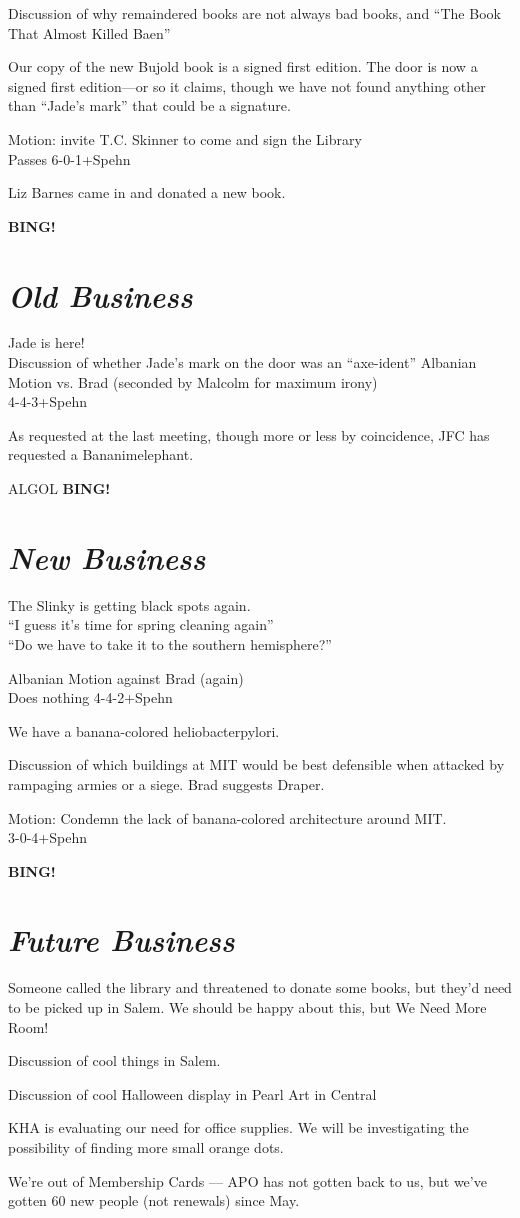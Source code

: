 \documentclass[10pt]{article}
\newcommand{\bing}{{\bf BING!} }
\newcommand{\goto}[1]{\bing \vskip 12pt \section*{{\em{#1}}}}
\begin{document}
Discussion of why remaindered books are not always bad books, and
``The Book That Almost Killed Baen''

Our copy of the new Bujold book is a signed first edition. The door is
now a signed first edition---or so it claims, though we have not found
anything other than ``Jade's mark'' that could be a signature.  

Motion: invite T.C. Skinner to come and sign the Library\\
Passes 6-0-1+Spehn

Liz Barnes came in and donated a new book.

\goto{Old Business}
Jade is here! \\
Discussion of whether Jade's mark on the door was an ``axe-ident''
Albanian Motion vs. Brad (seconded by Malcolm for maximum irony)\\
4-4-3+Spehn

As requested at the last meeting, though more or less by coincidence,
JFC has requested a Bananimelephant.

ALGOL
\goto{New Business}
The Slinky is getting black spots again.\\
``I guess it's time for spring cleaning again''\\
``Do we have to take it to the southern hemisphere?''

Albanian Motion against Brad (again)\\
Does nothing 4-4-2+Spehn

We have a banana-colored heliobacterpylori.

Discussion of which buildings at MIT would be best defensible when
attacked by rampaging armies or a siege.  Brad suggests Draper.

Motion: Condemn the lack of banana-colored architecture around MIT.\\
3-0-4+Spehn

\goto{Future Business}
Someone called the library and threatened to donate some books, but
they'd need to be picked up in Salem.
We should be happy about this, but We Need More Room!

Discussion of cool things in Salem.

Discussion of cool Halloween display in Pearl Art in Central

KHA is evaluating our need for office supplies. We will be
investigating the possibility of finding more small orange dots.

We're out of Membership Cards --- APO has not gotten back to us, but
we've gotten 60 new people (not renewals) since May.
\end{document}
